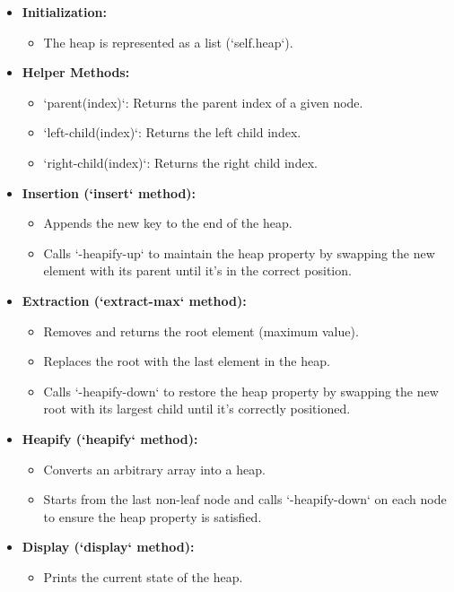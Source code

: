 \begin{itemize}
    \item \textbf{Initialization:}
    \begin{itemize}
        \item The heap is represented as a list (`self.heap`).
    \end{itemize}
    
    \item \textbf{Helper Methods:}
    \begin{itemize}
        \item `parent(index)`: Returns the parent index of a given node.
        \item `left-child(index)`: Returns the left child index.
        \item `right-child(index)`: Returns the right child index.
    \end{itemize}
    
    \item \textbf{Insertion (`insert` method):}
    \begin{itemize}
        \item Appends the new key to the end of the heap.
        \item Calls `-heapify-up` to maintain the heap property by swapping the new element with its parent until it's in the correct position.
    \end{itemize}
    
    \item \textbf{Extraction (`extract-max` method):}
    \begin{itemize}
        \item Removes and returns the root element (maximum value).
        \item Replaces the root with the last element in the heap.
        \item Calls `-heapify-down` to restore the heap property by swapping the new root with its largest child until it's correctly positioned.
    \end{itemize}
    
    \item \textbf{Heapify (`heapify` method):}
    \begin{itemize}
        \item Converts an arbitrary array into a heap.
        \item Starts from the last non-leaf node and calls `-heapify-down` on each node to ensure the heap property is satisfied.
    \end{itemize}
    
    \item \textbf{Display (`display` method):}
    \begin{itemize}
        \item Prints the current state of the heap.
    \end{itemize}
\end{itemize}

